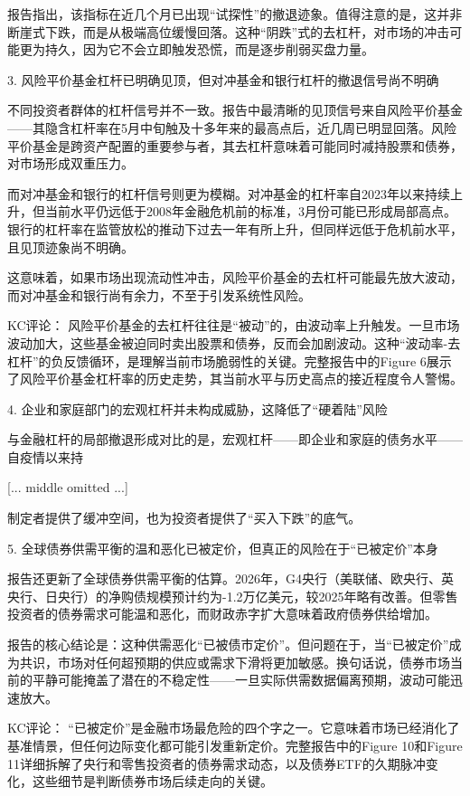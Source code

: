 \documentclass[11pt]{ctexart}
\begin{document}
报告指出，该指标在近几个月已出现“试探性”的撤退迹象。值得注意的是，这并非断崖式下跌，而是从极端高位缓慢回落。这种“阴跌”式的去杠杆，对市场的冲击可能更为持久，因为它不会立即触发恐慌，而是逐步削弱买盘力量。

3. 风险平价基金杠杆已明确见顶，但对冲基金和银行杠杆的撤退信号尚不明确

不同投资者群体的杠杆信号并不一致。报告中最清晰的见顶信号来自风险平价基金——其隐含杠杆率在5月中旬触及十多年来的最高点后，近几周已明显回落。风险平价基金是跨资产配置的重要参与者，其去杠杆意味着可能同时减持股票和债券，对市场形成双重压力。

而对冲基金和银行的杠杆信号则更为模糊。对冲基金的杠杆率自2023年以来持续上升，但当前水平仍远低于2008年金融危机前的标准，3月份可能已形成局部高点。银行的杠杆率在监管放松的推动下过去一年有所上升，但同样远低于危机前水平，且见顶迹象尚不明确。

这意味着，如果市场出现流动性冲击，风险平价基金的去杠杆可能最先放大波动，而对冲基金和银行尚有余力，不至于引发系统性风险。

KC评论： 风险平价基金的去杠杆往往是“被动”的，由波动率上升触发。一旦市场波动加大，这些基金被迫同时卖出股票和债券，反而会加剧波动。这种“波动率-去杠杆”的负反馈循环，是理解当前市场脆弱性的关键。完整报告中的Figure 6展示了风险平价基金杠杆率的历史走势，其当前水平与历史高点的接近程度令人警惕。

4. 企业和家庭部门的宏观杠杆并未构成威胁，这降低了“硬着陆”风险

与金融杠杆的局部撤退形成对比的是，宏观杠杆——即企业和家庭的债务水平——自疫情以来持

[... middle omitted ...]

制定者提供了缓冲空间，也为投资者提供了“买入下跌”的底气。

5. 全球债券供需平衡的温和恶化已被定价，但真正的风险在于“已被定价”本身

报告还更新了全球债券供需平衡的估算。2026年，G4央行（美联储、欧央行、英央行、日央行）的净购债规模预计约为-1.2万亿美元，较2025年略有改善。但零售投资者的债券需求可能温和恶化，而财政赤字扩大意味着政府债券供给增加。

报告的核心结论是：这种供需恶化“已被债市定价”。但问题在于，当“已被定价”成为共识，市场对任何超预期的供应或需求下滑将更加敏感。换句话说，债券市场当前的平静可能掩盖了潜在的不稳定性——一旦实际供需数据偏离预期，波动可能迅速放大。

KC评论： “已被定价”是金融市场最危险的四个字之一。它意味着市场已经消化了基准情景，但任何边际变化都可能引发重新定价。完整报告中的Figure 10和Figure 11详细拆解了央行和零售投资者的债券需求动态，以及债券ETF的久期脉冲变化，这些细节是判断债券市场后续走向的关键。
\end{document}
